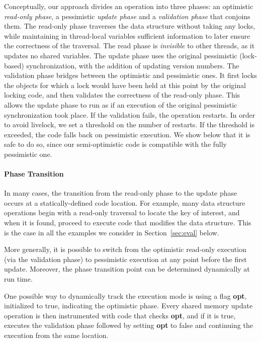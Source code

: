 Conceptually, our approach divides an operation into three phases: an optimistic \emph{read-only phase},
a pessimistic \emph{update phase} and a \emph{validation phase} that conjoins them.
The read-only phase traverses the data structure without taking any locks, while maintaining 
in thread-local variables
sufficient information to later ensure the correctness of the traversal.
The read phase is \emph{invisible} to other threads, as it updates no shared variables.
The update phase uses the original pessimistic (lock-based) synchronization, with the addition of updating version numbers.
The validation phase bridges between the optimistic and pessimistic ones.
It first locks the objects for which a lock would have been held at this point by
the original locking code, and then validates the correctness
of the read-only phase. This allows the
update phase to run as if an execution of the original pessimistic synchronization
took place. If the validation fails, the operation
restarts. In order to avoid livelock, we set a threshold on the number of restarts.
If the threshold is exceeded, the code falls back on pessimistic execution.
We show below that
it is safe to do so, since our semi-optimistic code is compatible
with the fully pessimistic one.


\paragraph{Phase Transition}
In many cases, the transition from the read-only phase to the update phase occurs at a statically-defined code location. For example, many data structure operations begin with a read-only traversal to locate the key of interest, and when it is found, proceed to execute code that modifies the data structure. This is the case in all the examples we consider in Section~\ref{sec:eval} below.

More generally, it is possible to switch from the optimistic read-only execution (via the validation phase) to pessimistic execution at any point before the first update. Moreover, the phase transition point can be determined dynamically at run time.

One possible way to dynamically track the execution mode is using a flag \textbf{opt}, initialized to true, indicating the optimistic phase. 
Every shared memory update operation is then instrumented with code that checks \textbf{opt}, and if it is true, executes the validation phase followed by setting \textbf{opt} to false and continuing the execution from the same location. 

